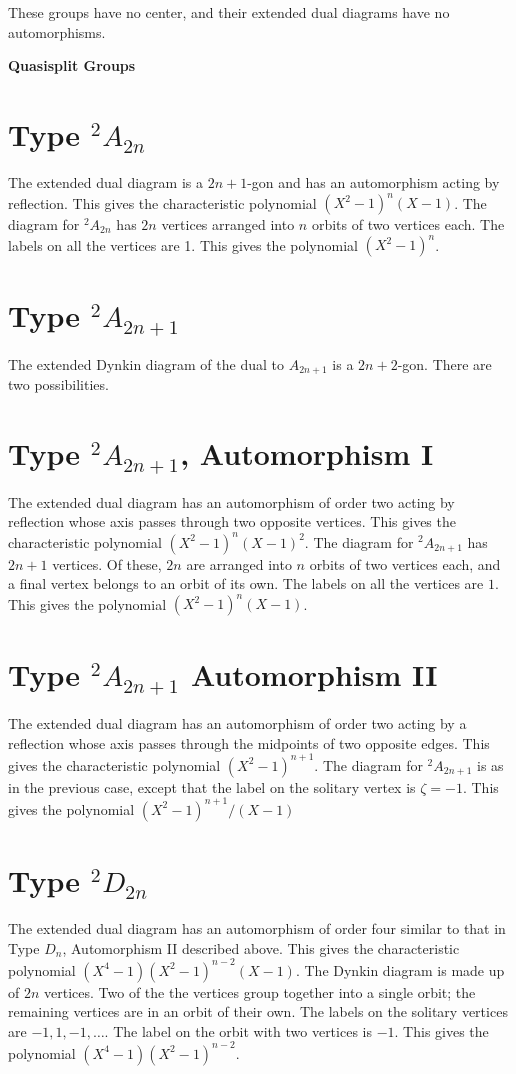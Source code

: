 \documentclass[11pt]{amsart}
\theoremstyle{plain}
\theoremstyle{definition}
\begin{document}
\quad
These groups have no center, and their extended dual diagrams have
no automorphisms.

\bigskip

\centerline{\bf Quasisplit Groups}

\section{Type ${}^2A_{2n}$}
The extended dual diagram is a $2n+1$-gon and 
has an automorphism acting by reflection.  This gives the
characteristic polynomial $(X^2-1)^n(X-1)$.   The diagram for ${}^2A_{2n}$
has $2n$ vertices arranged into $n$ orbits of two vertices each.  The
labels on all the vertices are 1.  This gives the polynomial
$(X^2-1)^n$.

\section{Type ${}^2A_{2n+1}$}
The extended Dynkin diagram of the dual to $A_{2n+1}$ is a $2n+2$-gon.
There are two possibilities.

\section{Type ${}^2A_{2n+1}$, Automorphism I}
The extended dual diagram has an automorphism of order two acting by
reflection whose axis passes through two opposite vertices.  This
gives the characteristic polynomial $(X^2-1)^n(X-1)^2$.    The diagram
for ${}^2A_{2n+1}$ has $2n+1$ vertices.  Of these, $2n$ are arranged
into $n$ orbits of two vertices each, and a final vertex belongs to
an orbit of its own.   The labels on all the vertices are $1$.  This
gives the polynomial $(X^2-1)^n(X-1)$.

\section{Type ${}^2A_{2n+1}$ Automorphism II}
The extended dual diagram has an automorphism of order two acting
by a reflection whose axis passes through the midpoints of two opposite
edges.  This gives the characteristic polynomial $(X^2-1)^{n+1}$.
The diagram for ${}^2A_{2n+1}$ is as in the previous case, except that
the label on the solitary vertex is $\zeta=-1$.  This gives the
polynomial $(X^2-1)^{n+1}/(X-1)$

\section{Type ${}^2D_{2n}$}
The extended dual diagram has an automorphism of order four similar
to that in Type $D_n$, Automorphism II described above.  This gives
the characteristic polynomial $(X^4-1)(X^2-1)^{n-2}(X-1)$.  The
Dynkin diagram is made up of $2n$ vertices.  Two of the the vertices group
together into a single orbit; the remaining vertices are in an orbit of
their own.  The labels on the solitary vertices are $-1,1,-1,\ldots$.
The label on the orbit with two vertices is $-1$.  This gives the
polynomial
$(X^4-1)(X^2-1)^{n-2}$.
\end{document}
